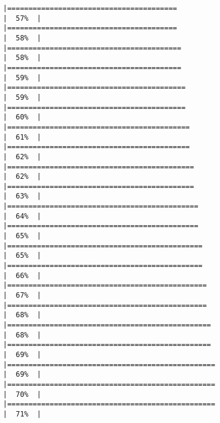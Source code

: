 \documentclass[
]{book}
\begin{document}
\begin{verbatim}
|========================================                              |  57%  |                                                                              |========================================                              |  58%  |                                                                              |=========================================                             |  58%  |                                                                              |=========================================                             |  59%  |                                                                              |==========================================                            |  59%  |                                                                              |==========================================                            |  60%  |                                                                              |===========================================                           |  61%  |                                                                              |===========================================                           |  62%  |                                                                              |============================================                          |  62%  |                                                                              |============================================                          |  63%  |                                                                              |=============================================                         |  64%  |                                                                              |=============================================                         |  65%  |                                                                              |==============================================                        |  65%  |                                                                              |==============================================                        |  66%  |                                                                              |===============================================                       |  67%  |                                                                              |===============================================                       |  68%  |                                                                              |================================================                      |  68%  |                                                                              |================================================                      |  69%  |                                                                              |=================================================                     |  69%  |                                                                              |=================================================                     |  70%  |                                                                              |=================================================                     |  71%  |                                                                              
\end{verbatim}
\end{document}
